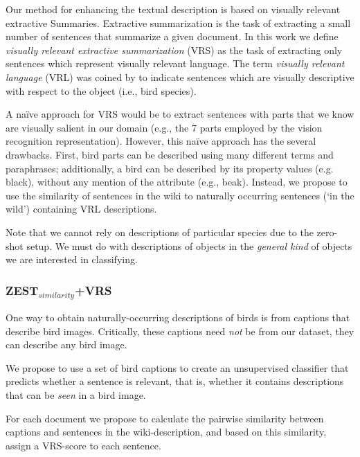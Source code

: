\documentclass[11pt,a4paper]{article}
\begin{document}
Our method for enhancing the textual description is based on visually relevant extractive Summaries.
Extractive summarization is the task of extracting a small number of sentences that summarize a given document.
In this work we define {\em visually relevant extractive summarization} (VRS) as the task of extracting only sentences which represent {visually relevant} language. The term {\em visually relevant language} (VRL) was coined by \citet{winn2016detecting} to indicate sentences which are visually descriptive with respect to the object (i.e., bird species).


A {na\"{i}ve} approach for VRS would be to extract sentences with  parts that we know are visually salient in our domain (e.g., the 7 parts employed by the vision recognition representation).  However, this na\"{i}ve approach has the several drawbacks. First, bird parts can be described using many different terms and paraphrases; additionally, a bird can be described by its property values (e.g. black), without any mention of the  attribute (e.g.,  beak). 
Instead, we propose to use the similarity of sentences in the wiki to naturally occurring sentences  (`in the wild') containing VRL descriptions. %

Note that we cannot rely on descriptions of particular species due to the zero-shot setup. We must do with descriptions of objects in the  {\em  general kind} %
of objects we are interested in classifying. 

\subsubsection{ZEST$_{similarity}$+VRS}
One way to obtain naturally-occurring descriptions of birds is from captions that describe bird images. Critically, these captions need {\em not}  be from  our dataset, they can describe any bird image. 

We propose to use a set of bird captions to create an unsupervised classifier that predicts whether a sentence is relevant, that is, whether it contains descriptions that can be {\em seen} in a bird image.

For each document we propose to calculate the pairwise similarity between captions and sentences in the wiki-description, and based on this similarity, assign a VRS-score to each sentence.
\end{document}
